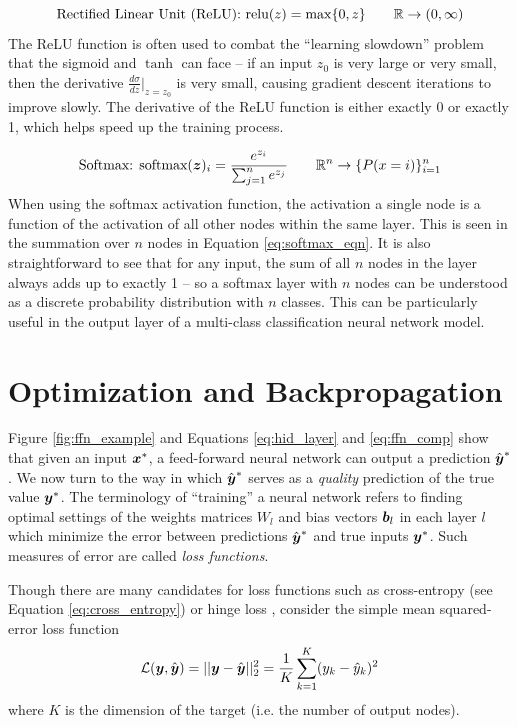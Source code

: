 \begin{equation}
  \text{Rectified Linear Unit (ReLU): } \text{relu}(z) = \max\{0, z\} \quad \quad \mathbb{R} \to (0,\infty)
  \label{eq:relu_eqn}
\end{equation}
The ReLU function is often used to combat the ``learning slowdown'' problem that the sigmoid and $\tanh$ can face -- if an input $z_0$ is very large or very small, then the derivative $\frac{d\sigma}{dz} \Big|_{z=z_0}$ is very small, causing gradient descent iterations to improve slowly. The derivative of the ReLU function is either exactly 0 or exactly 1, which helps speed up the training process.

\begin{equation}
  \text{Softmax: } \text{softmax}(\boldsymbol{z})_i = \frac{e^{z_i}}{\sum_{j=1}^n e^{z_j}} \quad \quad \mathbb{R}^n \to \{P(x=i)\}_{i=1}^n
  \label{eq:softmax_eqn}
\end{equation}
When using the softmax activation function, the activation a single node is a function of the activation of all other nodes within the same layer. This is seen in the summation over $n$ nodes in Equation \ref{eq:softmax_eqn}. It is also straightforward to see that for any input, the sum of all $n$ nodes in the layer always adds up to exactly 1 -- so a softmax layer with $n$ nodes can be understood as a discrete probability distribution with $n$ classes. This can be particularly useful in the output layer of a multi-class classification neural network model.


\section{Optimization and Backpropagation}\label{apdx:backprop}
Figure \ref{fig:ffn_example} and Equations \ref{eq:hid_layer} and \ref{eq:ffn_comp} show that given an input $\boldsymbol{x}^*$, a feed-forward neural network can output a prediction $\hat{\boldsymbol{y}}^*$. We now turn to the way in which $\hat{\boldsymbol{y}}^*$ serves as a \textit{quality} prediction of the true value $\boldsymbol{y}^*$. The terminology of ``training'' a neural network refers to finding optimal settings of the weights matrices $W_l$ and bias vectors $\boldsymbol{b}_l$ in each layer $l$ which minimize the error between predictions $\hat{\boldsymbol{y}}^*$ and true inputs $\boldsymbol{y}^*$. Such measures of error are called \textit{loss functions}.

Though there are many candidates for loss functions such as cross-entropy (see Equation \ref{eq:cross_entropy}) or hinge loss \cite{gentile1998}, consider the simple mean squared-error loss function
\begin{equation}
  \mathcal{L}(\boldsymbol{y}, \hat{\boldsymbol{y}}) = ||\boldsymbol{y} - \hat{\boldsymbol{y}}||_2^2 = \frac{1}{K} \sum_{k=1}^K (y_k - \hat{y}_k)^2
  \label{eq:mse_loss}
\end{equation}
where $K$ is the dimension of the target (i.e. the number of output nodes).

